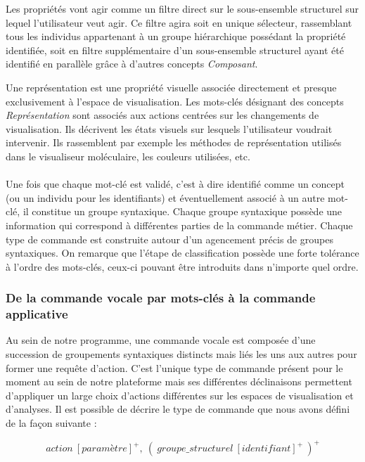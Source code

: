 Les propriétés vont agir comme un filtre direct sur le sous-ensemble structurel sur lequel l'utilisateur veut agir. Ce filtre agira soit en unique sélecteur, rassemblant tous les individus appartenant à un groupe hiérarchique possédant la propriété identifiée, soit en filtre supplémentaire d'un sous-ensemble structurel ayant été identifié en parallèle grâce à d'autres concepts \textit{Composant}.


Une représentation est une propriété visuelle associée directement et presque exclusivement à l'espace de visualisation. Les mots-clés désignant des concepts \textit{Représentation} sont associés aux actions centrées sur les changements de visualisation. Ils décrivent les états visuels sur lesquels l'utilisateur voudrait intervenir. Ils rassemblent par exemple les méthodes de représentation utilisés dans le visualiseur moléculaire, les couleurs utilisées, etc.
\\
\\
Une fois que chaque mot-clé est validé, c'est à dire identifié comme un concept (ou un individu pour les identifiants) et éventuellement associé à un autre mot-clé, il constitue un groupe syntaxique. Chaque groupe syntaxique possède une information qui correspond à différentes parties de la commande métier. Chaque type de commande est construite autour d'un agencement précis de groupes syntaxiques. On remarque que l'étape de classification possède une forte tolérance à l'ordre des mots-clés, ceux-ci pouvant être introduits dans n'importe quel ordre.


\subsubsection{De la commande vocale par mots-clés à la commande applicative} \label{command}

Au sein de notre programme, une commande vocale est composée d'une succession de groupements syntaxiques distincts mais liés les uns aux autres pour former une requête d'action. C'est l'unique type de commande présent pour le moment au sein de notre plateforme mais ses différentes déclinaisons permettent d'appliquer un large choix d'actions différentes sur les espaces de visualisation et d'analyses. Il est possible de décrire le type de commande que nous avons défini de la façon suivante :

$$action\ [paramètre]^+,\ (\ groupe\_structurel\ [identifiant]^+\ )^+$$

